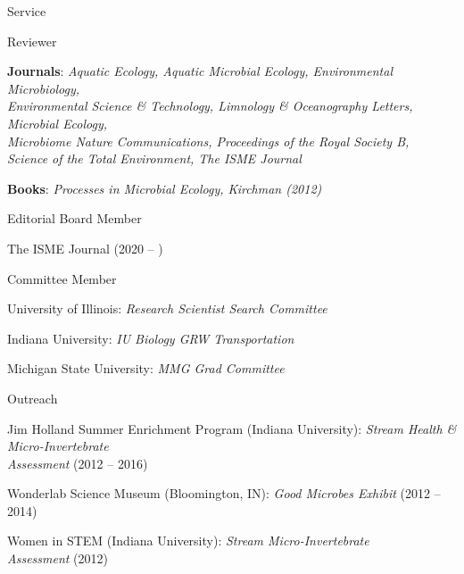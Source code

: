 \documentclass{resume} %
\begin{document}
\begin{rSection}{Service}

    \begin{rSubsection}{Reviewer}{}{}{}
        \item \textbf{Journals}: {\em Aquatic Ecology, Aquatic Microbial Ecology, Environmental Microbiology, \\ 
        Environmental Science \& Technology, Limnology \& Oceanography Letters, Microbial Ecology, \\ 
        Microbiome Nature Communications, Proceedings of the Royal Society B, \\ 
        Science of the Total Environment, The ISME Journal}
        \item \textbf{Books}: {\em Processes in Microbial Ecology, Kirchman (2012)}
    \end{rSubsection}
    
    \begin{rSubsection}{Editorial Board Member}{}{}{}
        \item The ISME Journal (2020 -- )
    \end{rSubsection}

    \begin{rSubsection}{Committee Member}{}{}{}
        \item University of Illinois: {\em Research Scientist Search Committee}
        \item Indiana University: {\em IU Biology GRW Transportation}
        \item Michigan State University: {\em MMG Grad Committee}
    \end{rSubsection}

    \begin{rSubsection}{Outreach}{}{}{}
        \item Jim Holland Summer Enrichment Program (Indiana University):
        {\em Stream Health \& Micro-Invertebrate\\Assessment} (2012 -- 2016)
        \item Wonderlab Science Museum (Bloomington, IN): {\em Good Microbes
        Exhibit} (2012 -- 2014)
        \item Women in STEM (Indiana University): {\em Stream Micro-Invertebrate
        \\ Assessment} (2012)
    \end{rSubsection}


\end{rSection}
\end{document}
